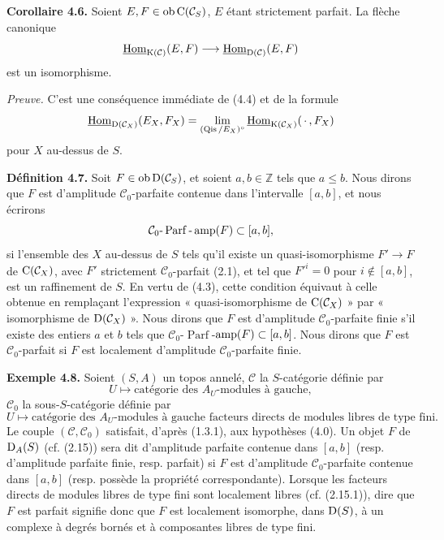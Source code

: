 \documentclass[11pt]{article}
\newcommand{\Parf}{\operatorname{Parf}}
\begin{document}
\textbf{Corollaire 4.6.} Soient \(E,F\in\operatorname{ob}\mathrm C(\mathcal C_S)\), \(E\) étant strictement parfait. La flèche canonique
\[
  \underline{\operatorname{Hom}}_{\mathrm K(\mathcal C)}(E,F)
  \longrightarrow
  \underline{\operatorname{Hom}}_{\mathrm D(\mathcal C)}(E,F)
\]
est un isomorphisme.

\emph{Preuve.} C'est une conséquence immédiate de (4.4) et de la formule
\[
  \underline{\operatorname{Hom}}_{\mathrm D(\mathcal C_X)}(E_X,F_X)
  = \lim_{(\operatorname{Qis}/E_X)^\circ}\underline{\operatorname{Hom}}_{\mathrm K(\mathcal C_X)}(\,\cdot\,,F_X)
\]
pour \(X\) au-dessus de \(S\).

\textbf{Définition 4.7.} Soit \(F\in\operatorname{ob}\mathrm D(\mathcal C_S)\), et soient \(a,b\in\mathbb Z\) tels que \(a\leq b\). Nous dirons que \(F\) est d'amplitude \(\mathcal C_0\)-parfaite contenue dans l'intervalle \([a,b]\), et nous écrirons
\[
  \mathcal C_0\text{-}\Parf\text{-}\amp(F)\subset[a,b],
\]
si l'ensemble des \(X\) au-dessus de \(S\) tels qu'il existe un quasi-isomorphisme \(F'\to F\) de \(\mathrm C(\mathcal C_X)\), avec \(F'\) strictement \(\mathcal C_0\)-parfait (2.1), et tel que \(F'^i=0\) pour \(i\notin[a,b]\), est un raffinement de \(S\). En vertu de (4.3), cette condition équivaut à celle obtenue en remplaçant l'expression « quasi-isomorphisme de \(\mathrm C(\mathcal C_X)\) » par « isomorphisme de \(\mathrm D(\mathcal C_X)\) ». Nous dirons que \(F\) est d'amplitude \(\mathcal C_0\)-parfaite finie s'il existe des entiers \(a\) et \(b\) tels que \(\mathcal C_0\)-\(\Parf\)-\(\operatorname{amp}(F)\subset[a,b]\). Nous dirons que \(F\) est \(\mathcal C_0\)-parfait si \(F\) est localement d'amplitude \(\mathcal C_0\)-parfaite finie.

\textbf{Exemple 4.8.} Soient \((S,A)\) un topos annelé, \(\mathcal C\) la \(S\)-catégorie définie par
\[
  U\longmapsto \text{catégorie des }A_U\text{-modules à gauche},
\]
\(\mathcal C_0\) la sous-\(S\)-catégorie définie par
\[
  U\longmapsto \text{catégorie des }A_U\text{-modules à gauche facteurs directs de modules libres de type fini}.
\]
Le couple \((\mathcal C,\mathcal C_0)\) satisfait, d'après (1.3.1), aux hypothèses (4.0). Un objet \(F\) de \(\mathrm D_A(S)\) (cf. (2.15)) sera dit d'amplitude parfaite contenue dans \([a,b]\) (resp. d'amplitude parfaite finie, resp. parfait) si \(F\) est d'amplitude \(\mathcal C_0\)-parfaite contenue dans \([a,b]\) (resp. possède la propriété correspondante). Lorsque les facteurs directs de modules libres de type fini sont localement libres (cf. (2.15.1)), dire que \(F\) est parfait signifie donc que \(F\) est localement isomorphe, dans \(\mathrm D(S)\), à un complexe à degrés bornés et à composantes libres de type fini.
\end{document}
